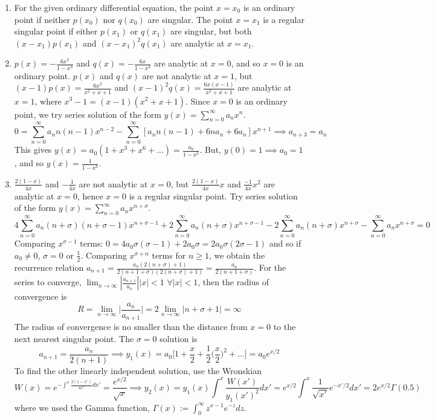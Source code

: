 \documentclass[a4paper]{article}
\begin{document}
\begin{ans}\leavevmode
\begin{enumerate}[label=(\alph*)]
\item For the given ordinary differential equation, the point $x=x_0$ is an ordinary point if neither $p(x_0)$ nor $q(x_0)$ are singular. The point $x=x_1$ is a regular singular point if either $p(x_1)$ or $q(x_1)$ are singular, but both $(x-x_1)p(x_1)$ and $(x-x_1)^2q(x_1)$ are analytic at $x=x_1$.
\item $p(x)=-\frac{6x^2}{1-x^3}$ and $q(x)=-\frac{6x}{1-x^3}$ are analytic at $x=0$, and so $x=0$ is an ordinary point. $p(x)$ and $q(x)$ are not analytic at $x=1$, but $(x-1)p(x)=\frac{6x^2}{x^2+x+1}$ and $(x-1)^2q(x)=\frac{6x(x-1)}{x^2+x+1}$ are analytic at $x=1$, where $x^3-1=(x-1)(x^2+x+1)$. Since $x=0$ is an ordinary point, we try series solution of the form $y(x)=\sum_{n=0}^\infty a_nx^n$.
$$0=\sum_{n=0}^\infty a_nn(n-1)x^{n-2}-\sum_{n=0}^\infty[a_nn(n-1)+6na_n+6a_n]x^{n+1}\implies a_{n+3}=a_n$$
This gives $y(x)=a_0(1+x^3+x^6+...)=\frac{a_0}{1-x^3}$. But, $y(0)=1\implies a_0=1$, and so $y(x)=\frac{1}{1-x^3}$.
\item $\frac{2(1-x)}{4x}$ and $-\frac{1}{4x}$ are not analytic at $x=0$, but $\frac{2(1-x)}{4x}x$ and $\frac{-1}{4x}x^2$ are analytic at $x=0$, hence $x=0$ is a regular singular point. Try series solution of the form $y(x)=\sum_{n=0}^\infty a_nx^{n+\sigma}$.
$$4\sum_{n=0}^\infty a_n(n+\sigma)(n+\sigma-1)x^{n+\sigma-1}+2\sum_{n=0}^\infty a_n(n+\sigma)x^{n+\sigma-1}-2\sum_{n=0}^\infty a_n(n+\sigma)x^{n+\sigma}-\sum_{n=0}^\infty a_nx^{n+\sigma}=0$$
Comparing $x^{\sigma-1}$ terms: $0=4a_0\sigma(\sigma-1)+2a_0\sigma=2a_0\sigma(2\sigma-1)$ and so if $a_0\neq0$, $\sigma=0$ or $\frac{1}{2}$. Comparing $x^{\sigma+n}$ terms for $n\geq1$, we obtain the recurrence relation $a_{n+1}=\frac{a_n(2(n+\sigma)+1)}{2(n+1+\sigma)(2(n+\sigma)+1)}=\frac{a_n}{2(n+1+\sigma)}$. For the series to converge, $\lim_{n\rightarrow\infty}|\frac{a_{n+1}}{a_n}||x|<1$ $\forall|x|<1$, then the radius of convergence is
$$R=\lim_{n\rightarrow\infty}\bigg|\frac{a_n}{a_{n+1}}\bigg|=2\lim_{n\rightarrow\infty}|n+\sigma+1|=\infty$$
The radius of convergence is no smaller than the distance from $x=0$ to the next nearest singular point. The $\sigma=0$ solution is
$$a_{n+1}=\frac{a_n}{2(n+1)}\implies y_1(x)=a_0\bigg[1+\frac{x}{2}+\frac{1}{2}\bigg(\frac{x}{2}\bigg)^2+...\bigg]=a_0e^{x/2}$$
To find the other linearly independent solution, use the Wronskian
$$W(x)=e^{-\int^x\frac{2(1-x')}{4x'}dx'}=\frac{e^{x/2}}{\sqrt{x}}\implies y_2(x)=y_1(x)\int^x\frac{W(x')}{y_1(x')^2}dx'=e^{x/2}\int^x\frac{1}{\sqrt{x'}}e^{-x'/2}dx'=2e^{x/2}\Gamma(0.5)$$
where we used the Gamma function, $\Gamma(x):=\int_0^\infty z^{x-1}e^{-z}dz$.
\end{enumerate}
\end{ans}
\end{document}
